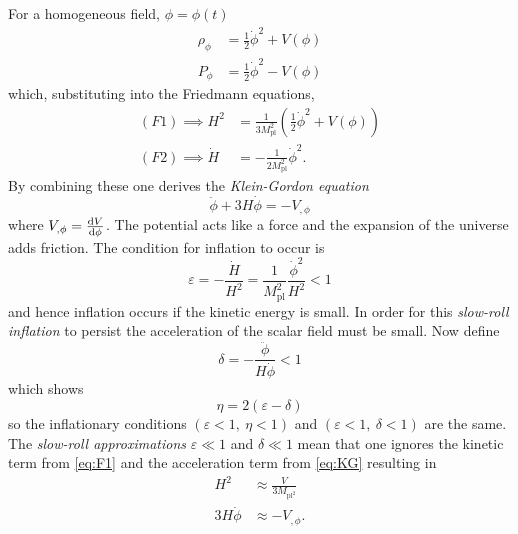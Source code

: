 %
For a homogeneous field, \ie{} \(\phi = \phi(t)\)
%
\begin{subequations}
	\begin{align}
		\rho_{\phi} & = \frac{1}{2}\dot{\phi}^{2} + V(\phi) \\
		P_{\phi}    & = \frac{1}{2}\dot{\phi}^{2} - V(\phi)
	\end{align}
\end{subequations}
%
which, substituting into the Friedmann equations,
%
\begin{subequations}
	\begin{align}
		(F1) \implies H^{2}   & = \frac{1}{3M_{\text{pl}}^{2}} \left( \frac{1}{2}\dot{\phi}^{2} + V(\phi) \right) \\
		(F2) \implies \dot{H} & = -\frac{1}{2M_{\text{pl}}^{2}} \dot{\phi}^{2}.
	\end{align}
\end{subequations}
%
By combining these one derives the \emph{Klein-Gordon equation}
%
\begin{equation}\label{eq:KG}
	\ddot{\phi} + 3H\dot{\phi}
	= -V_{,\phi}
\end{equation}
%
where \(V_{,\phi} = \dv{V}{\phi}\).
The potential acts like a force and the expansion of the universe adds friction.
The condition for inflation to occur is
%
\begin{equation}
	\varepsilon
	= -\frac{\dot{H}}{H^{2}}
	= \frac{1}{M_{\text{pl}}^{2}} \frac{\dot{\phi}^{2}}{H^{2}}
	< 1
\end{equation}
%
and hence inflation occurs if the kinetic energy is small.
In order for this \emph{slow-roll inflation} to persist the acceleration of the scalar field must be small.
Now define
%
\begin{equation}
	\delta
	= -\frac{\ddot{\phi}}{H\dot{\phi}}
	< 1
\end{equation}
%
which shows
%
\begin{equation}
	\eta
	= 2(\varepsilon - \delta)
\end{equation}
%
so the inflationary conditions \((\varepsilon<1,\ \eta<1)\) and \((\varepsilon<1,\ \delta<1)\) are the same.
The \emph{slow-roll approximations} \(\varepsilon \ll 1\) and \(\delta \ll 1\) mean that one ignores the kinetic term from \cref{eq:F1} and the acceleration term from \cref{eq:KG} resulting in
%
\begin{subequations}
	\begin{align}
		H^{2}        & \approx \frac{V}{3M_{\text{pl}^{2}}} \\
		3H\dot{\phi} & \approx -V_{,\phi}.
	\end{align}
\end{subequations}
